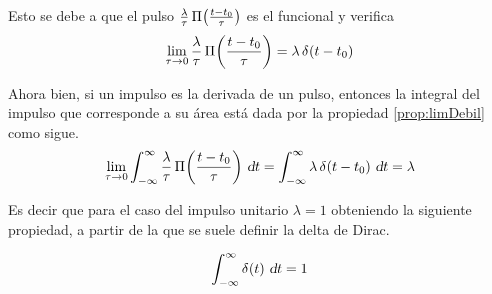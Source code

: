 Esto se debe a que el pulso $\frac{\lambda}{\tau} \, \fx[\Pi]{\frac{t-t_0}{\tau}}$ es el funcional y verifica
\begin{equation*}
    \lim_{\tau \to 0} \frac{\lambda}{\tau} \, \fx[\Pi]{\frac{t-t_0}{\tau}} = \lambda \, \fx[\delta]{t-t_0}
\end{equation*}

Ahora bien, si un impulso es la derivada de un pulso, entonces la integral del impulso que corresponde a su área está dada por la propiedad \ref{prop:limDebil} como sigue.
\begin{equation*}
    \lim_{\tau \to 0} \int_{-\infty}^\infty \frac{\lambda}{\tau} \, \fx[\Pi]{\frac{t-t_0}{\tau}} \, \dif t
    = \int_{-\infty}^\infty \lambda \, \fx[\delta]{t-t_0} \, \dif t
    = \lambda
\end{equation*}

Es decir que para el caso del impulso unitario $\lambda = 1$ obteniendo la siguiente propiedad, a partir de la que se suele definir la delta de Dirac.

\begin{mdframed}[style=MyFrame1]
    \begin{prop}
    \end{prop}
    \begin{equation*}
        \int_{-\infty}^\infty \fx[\delta]{t} \, \dif t = 1
    \end{equation*}
\end{mdframed}

